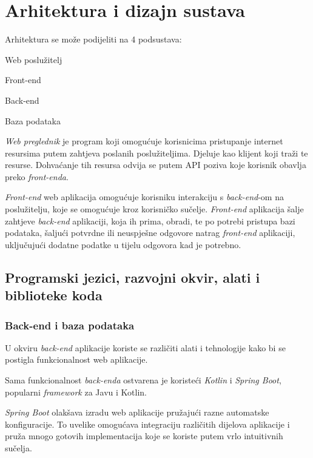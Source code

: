 \chapter{Arhitektura i dizajn sustava}
		
		Arhitektura se može podijeliti na 4 podsustava:
		
		\begin{packed_item}
		
			\item 	Web poslužitelj
			\item 	Front-end
			\item 	Back-end		
			\item   Baza podataka
		\end{packed_item}
		
		\textit{Web preglednik} je program koji omogućuje korisnicima pristupanje internet resursima putem zahtjeva poslanih poslužiteljima. Djeluje kao klijent koji traži te resurse. Dohvaćanje tih resursa odvija se putem API poziva koje korisnik obavlja preko \textit{front-enda}.
		
		\textit{Front-end} web aplikacija omogućuje korisniku interakciju s \textit{back-end}-om na poslužitelju, koje se omogućuje kroz korisničko sučelje. 
		\textit{Front-end} aplikacija šalje zahtjeve \textit{back-end} aplikaciji, koja ih prima, obradi, te po potrebi pristupa bazi podataka, šaljući potvrdne ili neuspješne odgovore natrag \textit{front-end} aplikaciji, uključujući dodatne podatke u tijelu odgovora kad je potrebno.\\
		
		\section{Programski jezici, razvojni okvir, alati i biblioteke koda}
		
		
		\subsection{Back-end i baza podataka}
		U okviru \textit{back-end} aplikacije koriste se različiti alati i tehnologije kako bi se postigla funkcionalnost web aplikacije. 
		
		Sama funkcionalnost \textit{back-enda} ostvarena je koristeći \textit{Kotlin} i \textit{Spring Boot}, popularni \textit{framework} za Javu i Kotlin.
		
		\textit{Spring Boot} olakšava izradu web aplikacije pružajući razne automatske konfiguracije. To uvelike omogućava integraciju različitih dijelova aplikacije i pruža mnogo gotovih implementacija koje se koriste putem vrlo intuitivnih sučelja.
		
